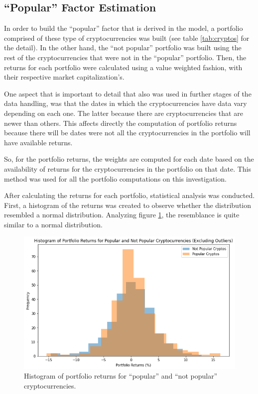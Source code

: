 \subsection{``Popular'' Factor Estimation}
\label{c423}
In order to build the ``popular'' factor that is derived in the model, a portfolio comprised of these type of cryptocurrencies was built (see table \ref{tab:cryptos} for the detail). In the other hand, the ``not popular'' portfolio was built using the rest of the cryptocurrencies that were not in the ``popular'' portfolio. Then, the returns for each portfolio were calculated using a value weighted fashion, with their respective market capitalization's.

One aspect that is important to detail that also was used in further stages of the data handling, was that the dates in which the cryptocurrencies have data vary depending on each one. The latter because there are cryptocurrencies that are newer than others. This affects directly the computation of portfolio returns because there will be dates were not all the cryptocurrencies in the portfolio will have available returns.

So, for the portfolio returns, the weights are computed for each date based on the availability of returns for the cryptocurrencies in the portfolio on that date. This method was used for all the portfolio computations on this investigation.

After calculating the returns for each portfolio, statistical analysis was conducted. First, a histogram of the returns was created to observe whether the distribution resembled a normal distribution. Analyzing figure \ref{fig:histogram-of-portfolio-returns}, the resemblance is quite similar to a normal distribution.
\begin{figure}[h!]
	\centering
	\includegraphics[width=0.95\linewidth]{"Histogram of portfolio returns"}
	\caption{Histogram of portfolio returns for ``popular'' and ``not popular'' cryptocurrencies.}
	\label{fig:histogram-of-portfolio-returns}
\end{figure}

